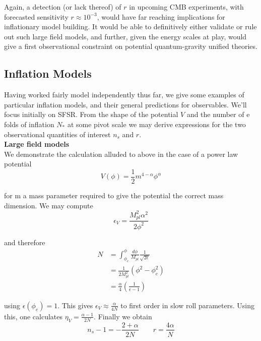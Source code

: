 \documentclass[a4paper,10pt]{article}
\newcommand{\Mp}{M_{pl}}
\newcommand{\half}{\frac{1}{2}}
\begin{document}
Again, a detection (or lack thereof) of $r$ in upcoming CMB experiments, with forecasted sensitivity $r\approx 10^{-3}$, would have far reaching implications for inflationary model building. It would be able to definitively either validate or rule out such large field models, and further, given the energy scales at play, would give a first observational constraint on potential quantum-gravity unified theories.

\subsection{Inflation Models}

Having worked fairly model independently thus far, we give some examples of particular inflation models, and their general predictions for observables. We'll focus initially on SFSR. From the shape of the potential $V$ and the number of e folds of inflation $N_*$ at some pivot scale we may derive expressions for the two observational quantities of interest $n_s$ and $r$. \\

\textbf{Large field models} \\

We demonstrate the calculation alluded to above in the case of a power law potential
\begin{equation}
V(\phi) = \half m^{4-\alpha}\phi^\alpha
\end{equation}

for m a mass parameter required to give the potential the correct mass dimension. We may compute 
\begin{equation}
\epsilon_V = \frac{\Mp^2\alpha^2}{2\phi^2}
\end{equation}

and therefore
\begin{equation}
\begin{split}
N &= \int_{\phi_e}^\phi \frac{d\phi}{\Mp}\frac{1}{\sqrt{2\epsilon}} \\
&= \frac{1}{2\Mp^2}(\phi^2-\phi^2_e)\\
&= \frac{\alpha}{4}\left(\frac{1}{\epsilon-1}\right)
\end{split}
\end{equation}

using $\epsilon(\phi_e)=1$. This gives $\epsilon_V \approx \frac{\alpha}{4N}$ to first order in slow roll parameters. Using this, one calculates $\eta_V=\frac{\alpha-1}{2N}$. Finally we obtain
\begin{equation}
n_s-1 = -\frac{2+\alpha}{2N} \qquad r=\frac{4\alpha}{N}
\end{equation}
\end{document}
